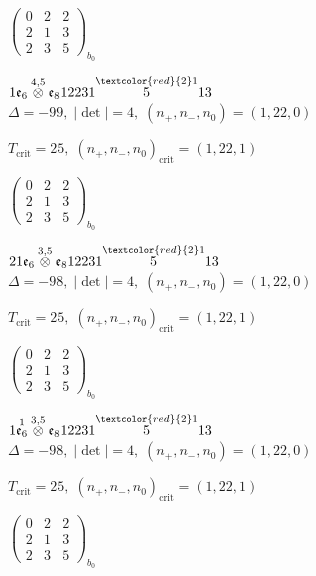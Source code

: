 \documentclass[10pt]{article}
\begin{document}
\hspace{2em}$\left(\begin{smallmatrix}0 & 2 & 2 \\ 2 & 1 & 3 \\ 2 & 3 & 5\end{smallmatrix}\right)_{\!b_0}$

\smallskip

$1\mathfrak{e}_6\overset{4,5}{\otimes}\mathfrak{e}_812231\overset{\textcolor{red}{2}1}{5}13$ \quad $\Delta=-99,\; |\det|=4,\; (n_+,n_-,n_0)=(1,22,0)$

\hspace{1em}$T_{\text{crit}}=25,\; (n_+,n_-,n_0)_{\text{crit}}=(1,22,1)$

\hspace{2em}$\left(\begin{smallmatrix}0 & 2 & 2 \\ 2 & 1 & 3 \\ 2 & 3 & 5\end{smallmatrix}\right)_{\!b_0}$

\smallskip

$21\mathfrak{e}_6\overset{3,5}{\otimes}\mathfrak{e}_812231\overset{\textcolor{red}{2}1}{5}13$ \quad $\Delta=-98,\; |\det|=4,\; (n_+,n_-,n_0)=(1,22,0)$

\hspace{1em}$T_{\text{crit}}=25,\; (n_+,n_-,n_0)_{\text{crit}}=(1,22,1)$

\hspace{2em}$\left(\begin{smallmatrix}0 & 2 & 2 \\ 2 & 1 & 3 \\ 2 & 3 & 5\end{smallmatrix}\right)_{\!b_0}$

\smallskip

$1\overset{1}{\mathfrak{e}_6}\overset{3,5}{\otimes}\mathfrak{e}_812231\overset{\textcolor{red}{2}1}{5}13$ \quad $\Delta=-98,\; |\det|=4,\; (n_+,n_-,n_0)=(1,22,0)$

\hspace{1em}$T_{\text{crit}}=25,\; (n_+,n_-,n_0)_{\text{crit}}=(1,22,1)$

\hspace{2em}$\left(\begin{smallmatrix}0 & 2 & 2 \\ 2 & 1 & 3 \\ 2 & 3 & 5\end{smallmatrix}\right)_{\!b_0}$
\end{document}
